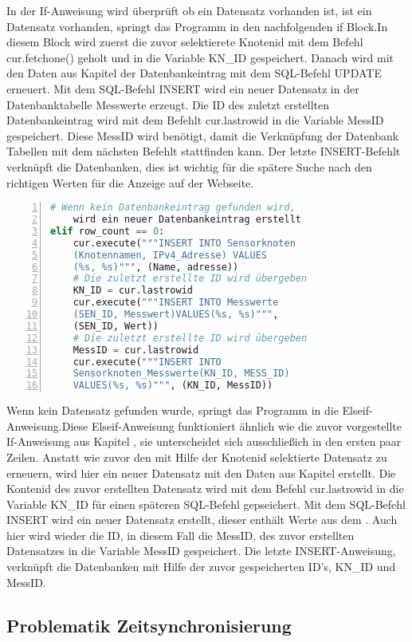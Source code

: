 \noindent In der If-Anweisung wird überprüft ob ein Datensatz vorhanden ist, ist ein Datensatz vorhanden, springt das Programm in den nachfolgenden if Block.In diesem Block wird zuerst die zuvor selektierete Knotenid mit dem Befehl cur.fetchone() geholt und in die Variable KN\_ID gespeichert. Danach wird mit den Daten aus Kapitel  der Datenbankeintrag mit dem SQL-Befehl UPDATE erneuert. Mit dem SQL-Befehl INSERT wird ein neuer Datensatz in der Datenbanktabelle Messwerte erzeugt. Die ID des zuletzt erstellten Datenbankeintrag wird mit dem Befehlt cur.lastrowid in die Variable MessID gespeichert. Diese MessID wird benötigt, damit die Verknüpfung der Datenbank Tabellen mit dem nächsten Befehlt stattfinden kann. Der letzte INSERT-Befehlt verknüpft die Datenbanken, dies ist wichtig für die spätere Suche nach den richtigen Werten für die Anzeige auf der Webseite. 
\begin{lstlisting}[caption=Ifelse-Anweisung des Befüllen der Datenbank,frame=single,numbers=left,language=Python]
	# Wenn kein Datenbankeintrag gefunden wird,
	wird ein neuer Datenbankeintrag erstellt
elif row_count == 0:
	cur.execute("""INSERT INTO Sensorknoten
	(Knotennamen, IPv4_Adresse) VALUES
	(%s, %s)""", (Name, adresse))
	# Die zuletzt erstellte ID wird übergeben
	KN_ID = cur.lastrowid
	cur.execute("""INSERT INTO Messwerte
	(SEN_ID, Messwert)VALUES(%s, %s)""",
	(SEN_ID, Wert))
	# Die zuletzt erstellte ID wird übergeben
	MessID = cur.lastrowid
	cur.execute("""INSERT INTO 
	Sensorknoten_Messwerte(KN_ID, MESS_ID)
	VALUES(%s, %s)""", (KN_ID, MessID))
\end{lstlisting}
\noindent Wenn kein Datensatz gefunden wurde, springt das Programm in die Elseif-Anweisung.Diese Elseif-Anweisung funktioniert ähnlich wie die zuvor vorgestellte If-Anweisung aus Kapitel , sie unterscheidet sich ausschließich in den ersten paar Zeilen. Anstatt wie zuvor den mit Hilfe der Knotenid selektierte Datensatz zu erneuern, wird hier ein neuer Datensatz mit den Daten aus Kapitel  erstellt. Die Kontenid des zuvor erstellten Datensatz wird mit dem Befehl cur.lastrowid in die Variable KN\_ID für einen späteren SQL-Befehl gepseichert. Mit dem SQL-Befehl INSERT wird ein neuer Datensatz erstellt, dieser enthält Werte aus dem . Auch hier wird wieder die ID, in diesem Fall die MessID, des zuvor erstellten Datensatzes in die Variable MessID gespeichert. Die letzte INSERT-Anweisung, verknüpft die Datenbanken mit Hilfe der zuvor gespeicherten ID's, KN\_ID und MessID.   
\subsection{Problematik Zeitsynchronisierung}
 

